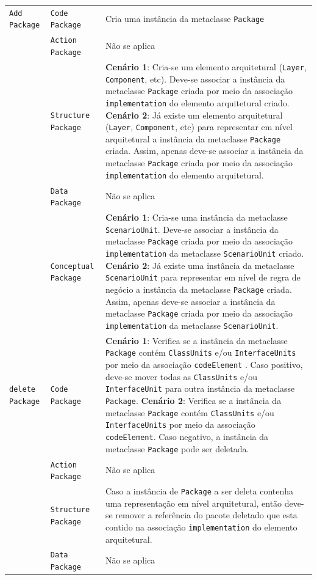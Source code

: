 \begin{longtable}{ | m{1.9cm} | m{3.57cm}| m{9.3cm} | }
 \texttt{Add} \texttt{Package} & \texttt{Code Package} & Cria uma instância da metaclasse \texttt{Package}\tabularnewline
\cline{2-3} 
\cline{2-3} 
 & \texttt{Action Package} & Não se aplica \tabularnewline
 \cline{2-3} 
 & \texttt{Structure Package} & \textbf{Cenário 1}: Cria-se um elemento arquitetural (\texttt{Layer}, \texttt{Component}, etc). Deve-se associar a instância da metaclasse \texttt{Package} criada por meio da associação  \texttt{implementation} do elemento arquitetural criado. \textbf{Cenário 2}: Já existe um elemento arquitetural (\texttt{Layer}, \texttt{Component}, etc) para representar em nível arquitetural a instância da metaclasse \texttt{Package} criada. Assim, apenas deve-se associar a instância da metaclasse \texttt{Package} criada por meio da associação \texttt{implementation} do elemento arquitetural. \tabularnewline
\cline{2-3} 
 & \texttt{Data Package} & Não se aplica \tabularnewline
\cline{2-3} 
 & \texttt{Conceptual Package} & \textbf{Cenário 1}: Cria-se uma instância da metaclasse \texttt{ScenarioUnit}. Deve-se associar a instância da metaclasse \texttt{Package} criada por meio da associação \texttt{implementation} da metaclasse \texttt{ScenarioUnit} criado. \textbf{Cenário 2}: Já existe uma instância da metaclasse \texttt{ScenarioUnit} para representar em nível de regra de negócio a instância da metaclasse \texttt{Package} criada. Assim, apenas deve-se associar a instância da metaclasse \texttt{Package} criada por meio da associação \texttt{implementation} da metaclasse \texttt{ScenarioUnit}. \tabularnewline
\hline 
 \texttt{delete} \texttt{Package} & \texttt{Code Package} & \textbf{Cenário 1}: Verifica se a instância da metaclasse \texttt{Package} contém \texttt{ClassUnits} e/ou \texttt{InterfaceUnits}  por meio da associação \texttt{codeElement} . Caso positivo, deve-se mover todas as \texttt{ClassUnits} e/ou \texttt{InterfaceUnit} para outra instância da metaclasse \texttt{Package}. \textbf{Cenário 2}: Verifica se a instância da metaclasse \texttt{Package} contém \texttt{ClassUnits} e/ou \texttt{InterfaceUnits}  por meio da associação \texttt{codeElement}. Caso negativo, a instância da metaclasse \texttt{Package} pode ser deletada.\tabularnewline
\cline{2-3} 
& \texttt{Action Package} & Não se aplica \tabularnewline
\cline{2-3}
& \texttt{Structure Package} & Caso a instância de \texttt{Package} a ser deleta contenha uma representação em nível arquitetural, então deve-se remover a referência do pacote deletado que esta contido na associação \texttt{implementation} do elemento arquitetural. \tabularnewline
\cline{2-3}
& \texttt{Data Package} & Não se aplica \tabularnewline

\end{longtable}
